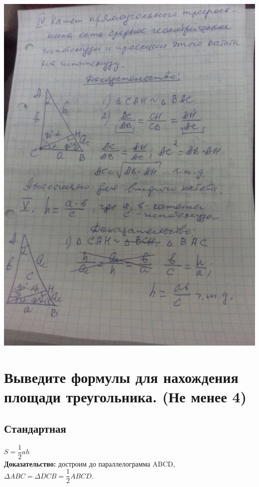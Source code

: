 \documentclass[12pt, letterpaper]{article}
\begin{document}
\includegraphics[scale=0.3]{solve19-2.jpg} \\

\section {Выведите формулы для нахождения площади треугольника. (Не менее 4)}
\subsection {Стандартная}
$S=\dfrac{1}{2}ah $ \\
\textbf{Доказательство:} достроим до параллелограмма ABCD,\\
$\Delta ABC = \Delta DCB = \dfrac{1}{2}ABCD. $ \\
\end{document}
